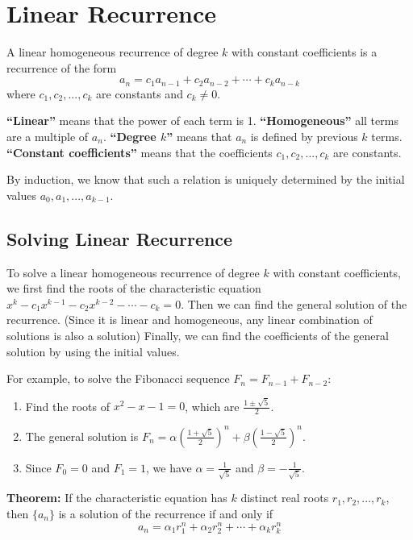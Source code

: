 \documentclass[a4paper,12pt]{article}
\begin{document}
\section{Linear Recurrence}

A linear homogeneous recurrence of degree $k$ with constant coefficients is a recurrence of the form
\begin{equation*}
	a_n = c_1 a_{n-1} + c_2 a_{n-2} + \cdots + c_k a_{n-k}
\end{equation*}
where $c_1, c_2, ..., c_k$ are constants and $c_k \neq 0$.

\textbf{``Linear''} means that the power of each term is 1.
\textbf{``Homogeneous''} all terms are a multiple of $a_n$.
\textbf{``Degree $k$''} means that $a_n$ is defined by previous $k$ terms. 
\textbf{``Constant coefficients''} means that the coefficients $c_1, c_2, ..., c_k$ are constants.

By induction, we know that such a relation is uniquely determined by the initial values $a_0, a_1, ..., a_{k-1}$.

\subsection{Solving Linear Recurrence}

To solve a linear homogeneous recurrence of degree $k$ with constant coefficients, we first find the roots of the characteristic equation $x^k - c_1 x^{k-1} - c_2 x^{k-2} - \cdots - c_k = 0$.
Then we can find the general solution of the recurrence. (Since it is linear and homogeneous, any linear combination of solutions is also a solution)
Finally, we can find the coefficients of the general solution by using the initial values.

For example, to solve the Fibonacci sequence $F_n = F_{n-1} + F_{n-2}$:
\begin{enumerate}
	\item Find the roots of $x^2 - x - 1 = 0$, which are $\frac{1 \pm \sqrt{5}}{2}$.
	\item The general solution is $F_n = \alpha \left(\frac{1 + \sqrt{5}}{2}\right)^n + \beta \left(\frac{1 - \sqrt{5}}{2}\right)^n$.
	\item Since $F_0 = 0$ and $F_1 = 1$, we have $\alpha = \frac{1}{\sqrt{5}}$ and $\beta = -\frac{1}{\sqrt{5}}$.
\end{enumerate}

\textbf{Theorem:}
If the characteristic equation has $k$ distinct real roots $r_1, r_2, ..., r_k$, then $\{a_n\}$ is a solution of the recurrence if and only if
\begin{equation*}
	a_n = \alpha_1 r_1^n + \alpha_2 r_2^n + \cdots + \alpha_k r_k^n
\end{equation*}
\end{document}
